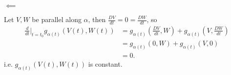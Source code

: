 \documentclass{article}
\begin{document}
\(\impliedby\)

Let \(V,W\) be parallel along \(\alpha\), then \(\frac{DV}{dt}=0=\frac{DW}{dt}\), so
\begin{align*}
  \frac{d}{dt}\bigg|_{t=t_0}g_{\alpha(t)}(V(t),W(t))&=g_{\alpha(t)}\left(\frac{DV}{dt},W\right)+g_{\alpha(t)}\left(V,\frac{DW}{dt}\right)\\
  &=g_{\alpha(t)}\left(0,W\right)+g_{\alpha(t)}\left(V,0\right)\\
  &=0.
\end{align*}
i.e. \(g_{\alpha(t)}(V(t),W(t))\) is constant.
\end{document}
